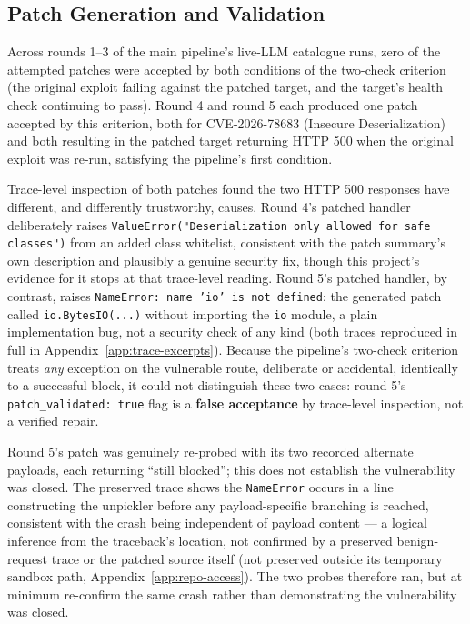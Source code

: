 \documentclass[12pt,a4paper]{report}
\begin{document}
\subsection{Patch Generation and Validation}
\label{sec:patch-generation-validation}

Across rounds 1--3 of the main pipeline's live-LLM catalogue runs, zero of the attempted patches were accepted by both conditions of the two-check criterion (the original exploit failing against the patched target, and the target's health check continuing to pass). Round 4 and round 5 each produced one patch accepted by this criterion, both for CVE-2026-78683 (Insecure Deserialization) and both resulting in the patched target returning HTTP 500 when the original exploit was re-run, satisfying the pipeline's first condition.

Trace-level inspection of both patches found the two HTTP 500 responses have different, and differently trustworthy, causes. Round 4's patched handler deliberately raises \texttt{ValueError("Deserialization only allowed for safe classes")} from an added class whitelist, consistent with the patch summary's own description and plausibly a genuine security fix, though this project's evidence for it stops at that trace-level reading. Round 5's patched handler, by contrast, raises \texttt{NameError: name 'io' is not defined}: the generated patch called \texttt{io.BytesIO(...)} without importing the \texttt{io} module, a plain implementation bug, not a security check of any kind (both traces reproduced in full in Appendix~\ref{app:trace-excerpts}). Because the pipeline's two-check criterion treats \emph{any} exception on the vulnerable route, deliberate or accidental, identically to a successful block, it could not distinguish these two cases: round 5's \texttt{patch\_validated: true} flag is a \textbf{false acceptance} by trace-level inspection, not a verified repair.

Round 5's patch was genuinely re-probed with its two recorded alternate payloads, each returning ``still blocked''; this does not establish the vulnerability was closed. The preserved trace shows the \texttt{NameError} occurs in a line constructing the unpickler before any payload-specific branching is reached, consistent with the crash being independent of payload content — a logical inference from the traceback's location, not confirmed by a preserved benign-request trace or the patched source itself (not preserved outside its temporary sandbox path, Appendix~\ref{app:repo-access}). The two probes therefore ran, but at minimum re-confirm the same crash rather than demonstrating the vulnerability was closed.
\end{document}
